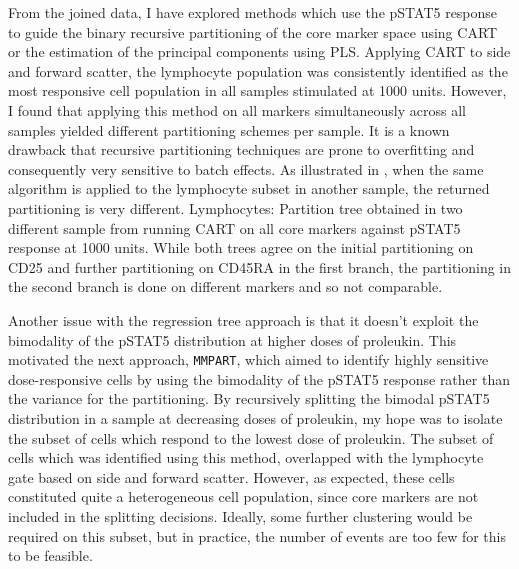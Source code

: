 From the joined data, I have explored methods which use the pSTAT5 response to guide the binary recursive partitioning of the core marker space using \gls{CART} or the estimation of the principal components using \gls{PLS}.
Applying \gls{CART} to side and forward scatter, the lymphocyte population was consistently identified as the most responsive cell population in all samples stimulated at 1000 units.
However, I found that applying this method on all markers simultaneously across all samples yielded different partitioning schemes per sample.
It is a known drawback that recursive partitioning techniques are prone to overfitting and consequently very sensitive to batch effects.
As illustrated in , when the same algorithm is applied to the lymphocyte subset in another sample, the returned partitioning is very different.
{ Lymphocytes: Partition tree obtained in two different sample from running CART on all core markers against pSTAT5 response at 1000 units. }
{
  While both trees agree on the initial partitioning on CD25 and further partitioning on CD45RA in the first branch,
  the partitioning in the second branch is done on different markers and so not comparable.
} 


Another issue with the regression tree approach is that it doesn't exploit the bimodality of the pSTAT5 distribution at higher doses of proleukin.
This motivated the next approach, \texttt{MMPART}, which aimed to identify highly sensitive dose-responsive cells by using the bimodality of the pSTAT5 response rather than the variance for the partitioning.
By recursively splitting the bimodal pSTAT5 distribution in a sample at decreasing doses of proleukin, my hope was to isolate the subset of cells which respond to the lowest dose of proleukin.
The subset of cells which was identified using this method, overlapped with the lymphocyte gate based on side and forward scatter.
However, as expected, these cells constituted quite a heterogeneous cell population, since core markers are not included in the splitting decisions.
Ideally, some further clustering would be required on this subset, but in practice, the number of events are too few for this to be feasible.

